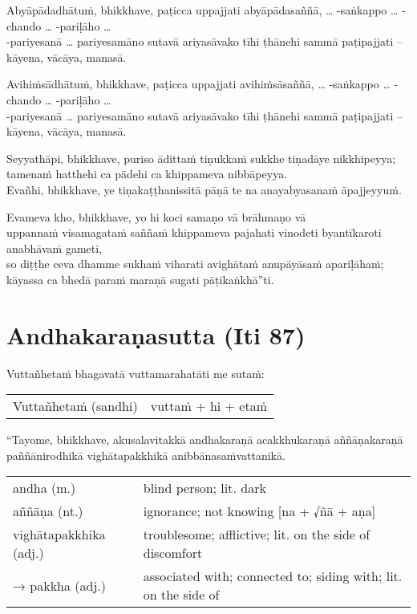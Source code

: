 \documentclass[11pt,oneside]{memoir}
\begin{document}
Abyāpādadhātuṁ, bhikkhave, paṭicca uppajjati abyāpādasaññā,
\ldots{} -saṅkappo \ldots{} -chando \ldots{} -pariḷāho \ldots{} \\[0pt]
-pariyesanā \ldots{} pariyesamāno sutavā ariyasāvako
tīhi ṭhānehi sammā paṭipajjati -- kāyena, vācāya, manasā.

Avihiṁsādhātuṁ, bhikkhave, paṭicca uppajjati avihiṁsāsaññā,
\ldots{} -saṅkappo \ldots{} -chando \ldots{} -pariḷāho \ldots{} \\[0pt]
-pariyesanā \ldots{} pariyesamāno sutavā ariyasāvako
tīhi ṭhānehi sammā paṭipajjati -- kāyena, vācāya, manasā.

Seyyathāpi, bhikkhave, puriso ādittaṁ tiṇukkaṁ sukkhe tiṇadāye nikkhipeyya; \\[0pt]
tamenaṁ hatthehi ca pādehi ca khippameva nibbāpeyya. \\[0pt]
Evañhi, bhikkhave, ye tiṇakaṭṭhanissitā pāṇā te na anayabyasanaṁ āpajjeyyuṁ.

Evameva kho, bhikkhave, yo hi koci samaṇo vā brāhmaṇo vā \\[0pt]
uppannaṁ visamagataṁ saññaṁ khippameva pajahati vinodeti byantīkaroti anabhāvaṁ gameti, \\[0pt]
so diṭṭhe ceva dhamme sukhaṁ viharati avighātaṁ anupāyāsaṁ apariḷāhaṁ; \\[0pt]
kāyassa ca bhedā paraṁ maraṇā sugati pāṭikaṅkhā”ti.

\section{Andhakaraṇasutta (Iti 87)}
\label{sec:org896cdd8}

Vuttañhetaṁ bhagavatā vuttamarahatāti me sutaṁ:

\begin{longtable}{L{\colOne} L{\colTwo}}
Vuttañhetaṁ (sandhi) & vuttaṁ + hi + etaṁ\\[0pt]
\end{longtable}

“Tayome, bhikkhave, akusalavitakkā andhakaraṇā acakkhukaraṇā aññāṇakaraṇā
paññānirodhikā vighātapakkhikā anibbānasaṁvattanikā.

\begin{longtable}{L{\colOne} L{\colTwo}}
andha (m.) & blind person; lit. dark\\[0pt]
aññāṇa (nt.) & ignorance; not knowing [na + √ñā + aṇa]\\[0pt]
vighātapakkhika (adj.) & troublesome; afflictive; lit. on the side of discomfort\\[0pt]
→ pakkha (adj.) & associated with; connected to; siding with; lit. on the side of\\[0pt]
\end{longtable}
\end{document}

